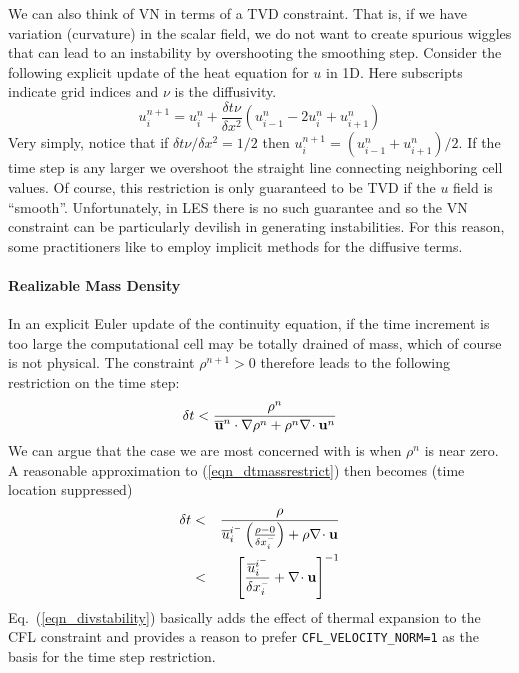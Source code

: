 \documentclass[11pt]{article}
\begin{document}
We can also think of VN in terms of a TVD constraint.  That is, if we have variation (curvature) in the scalar field, we do not want to create spurious wiggles that can lead to an instability by overshooting the smoothing step.  Consider the following explicit update of the heat equation for $u$ in 1D. Here subscripts indicate grid indices and $\nu$ is the diffusivity.
\begin{equation}
u_i^{n+1} = u_i^n + \frac{\delta t \nu}{\delta x^2} (u_{i-1}^n - 2u_i^n + u_{i+1}^n )
\end{equation}
Very simply, notice that if $\delta t \nu/\delta x^2 = 1/2$ then $u_i^{n+1} = (u_{i-1}^n + u_{i+1}^n)/2$.  If the time step is any larger we overshoot the straight line connecting neighboring cell values.  Of course, this restriction is only guaranteed to be TVD if the $u$ field is ``smooth''.  Unfortunately, in LES there is no such guarantee and so the VN constraint can be particularly devilish in generating instabilities. For this reason, some practitioners like to employ implicit methods for the diffusive terms.

\paragraph{Realizable Mass Density}

In an explicit Euler update of the continuity equation, if the time increment is too large the computational cell may be totally drained of mass, which of course is not physical. The constraint $\rho^{n+1}>0$ therefore leads to the following restriction on the time step:
\begin{equation}
\label{eqn_dtmassrestrict}
\delta t < \frac{\rho^n}{\overline{\mathbf{u}}^n\cdot\nabla\rho^n + \rho^n \nabla\!\cdot\mathbf{u}^n}
\end{equation}
We can argue that the case we are most concerned with is when $\rho^n$ is near zero.  A reasonable approximation to (\ref{eqn_dtmassrestrict}) then becomes (time location suppressed)
\begin{eqnarray}
\label{eqn_divstability}
\delta t &<& \frac{\rho}{\overline{u}_i^{i^{\scriptscriptstyle -}} \left(\frac{\rho-0}{\delta x_i^{\scriptscriptstyle -}}\right) + \rho \nabla\!\cdot\mathbf{u}} \nonumber\\
&<& \left[ \frac{\overline{u}_i^{i^{\scriptscriptstyle -}}}{\delta x_i^{\scriptscriptstyle -}} + \nabla\!\cdot\mathbf{u} \right]^{-1}
\end{eqnarray}
Eq.~(\ref{eqn_divstability}) basically adds the effect of thermal expansion to the CFL constraint and provides a reason to prefer {\tt CFL\_VELOCITY\_NORM=1} as the basis for the time step restriction.
\end{document}
